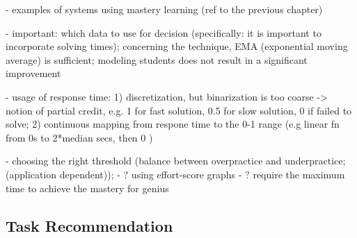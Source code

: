 - examples of systems using mastery learning (ref to the previous chapter)

- important: which data to use for decision (specifically: it is important to
incorporate solving times); concerning the technique, EMA (exponential moving
average) is sufficient; modeling students does not result in a significant
improvement \cite{alg.mastery}

- usage of response time:
1) discretization, but binarization is too coarse
-> notion of partial credit, e.g. 1 for fast solution, 0.5 for slow solution,
0 if failed to solve;
2) continuous mapping from respone time to the 0-1 range
(e.g linear fn from 0s to 2*median secs, then 0 \cite{alg.mastery})


- choosing the right threshold (balance between overpractice and underpractice;
(application dependent));
- ? using effort-score graphs \cite{alg.mastery}
- ? require the maximum time to achieve the mastery for genius

\subsection{Task Recommendation}  %
\label{sec:task-recommendation}


